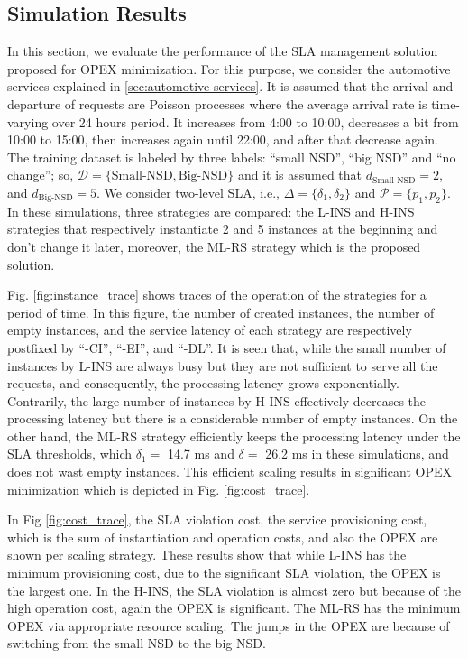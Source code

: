 \documentclass[conference, final]{IEEEtran}
\newcommand{\hlb}[2][blue]{{\color{#1} {#2}}\unskip }
\begin{document}
\subsection{Simulation Results}
\hlb{

In this section, we evaluate the performance of the SLA management solution proposed for OPEX minimization. For this purpose, we consider the automotive services explained in \ref{sec:automotive-services}. It is assumed that the arrival and departure of requests are Poisson processes where the average arrival rate is time-varying over 24 hours period.  It increases from 4:00 to 10:00, decreases a bit from 10:00 to 15:00, then increases again until 22:00, and after that decrease again. The training dataset is labeled by three labels: ``small NSD'', ``big NSD'' and ``no change''; so, $\mathcal{D}=\{\text{Small-NSD}, \text{Big-NSD}\}$ and it is assumed that $d_{\text{Small-NSD}} = 2$, and $d_{\text{Big-NSD}} = 5$. We consider two-level SLA, i.e., $\Delta=\{\delta_{1}, \delta_{2}\}$ and $\mathcal{P}=\{p_{1}, p_{2}\}$. In these simulations, three strategies are compared: the {\small \textsf{L-INS}} and {\small \textsf{H-INS}} strategies that respectively instantiate 2 and 5 instances at the beginning and don't change it later, moreover, the {\small \textsf{ML-RS}} strategy which is the proposed solution.

Fig. \ref{fig:instance_trace} shows traces of the operation of the strategies for a period of time. In this figure, the number of created instances, the number of empty instances, and the service latency of each strategy are respectively postfixed by ``-CI'', ``-EI'', and ``-DL''. It is seen that, while the small number of instances by {\small \textsf{L-INS}} are always busy but they are not sufficient to serve all the requests, and consequently, the processing latency grows exponentially. Contrarily, the large number of instances by {\small \textsf{H-INS}} effectively decreases the processing latency but there is a considerable number of empty instances. On the other hand, the {\small \textsf{ML-RS}} strategy efficiently keeps the processing latency under the SLA thresholds, which $\delta_{1} =$ 14.7 ms and $\delta =$ 26.2 ms in these simulations, and does not wast empty instances. This efficient scaling results in significant OPEX minimization which is depicted in Fig. \ref{fig:cost_trace}.

In Fig \ref{fig:cost_trace}, the SLA violation cost, the service provisioning cost, which is the sum of instantiation and operation costs, and also the OPEX are shown per scaling strategy. These results show that while {\small \textsf{L-INS}} has the minimum provisioning cost, due to the significant SLA violation, the OPEX is the largest one. In the  {\small \textsf{H-INS}}, the SLA violation is almost zero but because of the high operation cost, again the OPEX is significant. The {\small \textsf{ML-RS}} has the minimum OPEX via appropriate resource scaling. The jumps in the OPEX are because of switching from the small NSD to the big NSD. 


}
\end{document}
